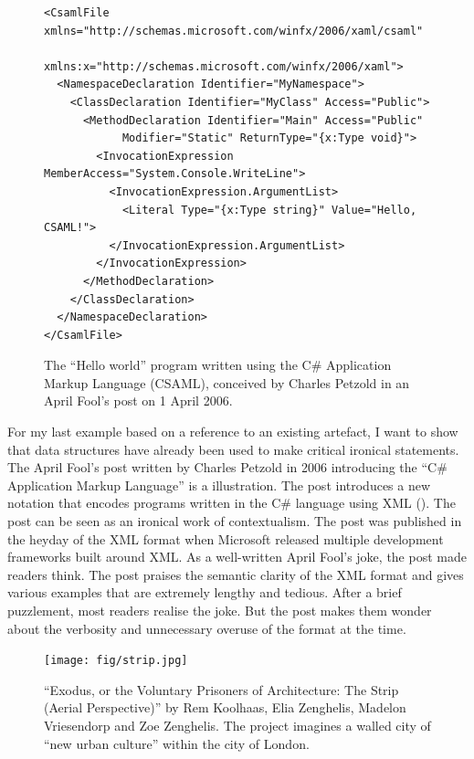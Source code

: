\begin{figure}
\begin{lstlisting}[language=csxml]
<CsamlFile xmlns="http://schemas.microsoft.com/winfx/2006/xaml/csaml"
      xmlns:x="http://schemas.microsoft.com/winfx/2006/xaml">
  <NamespaceDeclaration Identifier="MyNamespace">
    <ClassDeclaration Identifier="MyClass" Access="Public">
      <MethodDeclaration Identifier="Main" Access="Public"
            Modifier="Static" ReturnType="{x:Type void}">
        <InvocationExpression MemberAccess="System.Console.WriteLine">
          <InvocationExpression.ArgumentList>
            <Literal Type="{x:Type string}" Value="Hello, CSAML!">
          </InvocationExpression.ArgumentList>
        </InvocationExpression>
      </MethodDeclaration>
    </ClassDeclaration>
  </NamespaceDeclaration>
</CsamlFile>
\end{lstlisting}
\caption{The ``Hello world'' program written using the C\# Application Markup Language (CSAML),
conceived by Charles Petzold in an April Fool's post on 1 April 2006.}
\label{fig:csaml}
\end{figure}

For my last example based on a reference to an existing artefact, I want to show that
data structures have already been used to make critical ironical statements. The April Fool's
post written by Charles Petzold in 2006 introducing the ``C\# Application Markup Language''
is a illustration.
The post introduces a new notation that encodes programs written in the C\# language
using XML (). The post can be seen as an ironical work of contextualism.
The post was published in the heyday of the XML format when Microsoft released multiple
development frameworks built around XML. As a well-written April Fool's joke, the post
made readers think. The post praises the semantic clarity of the XML format and gives
various examples that are extremely lengthy and tedious. After a brief puzzlement, most readers
realise the joke. But the post makes them wonder about the verbosity and unnecessary
overuse of the format at the time.

\begin{figure}
\centering
\texttt{[image: fig/strip.jpg]}\quad
\caption{``Exodus, or the Voluntary Prisoners of Architecture: The Strip (Aerial Perspective)''
by Rem Koolhaas, Elia Zenghelis, Madelon Vriesendorp and Zoe Zenghelis. The project
imagines a walled city of ``new urban culture'' within the city of London.}
\label{fig:exodus}
\end{figure}

